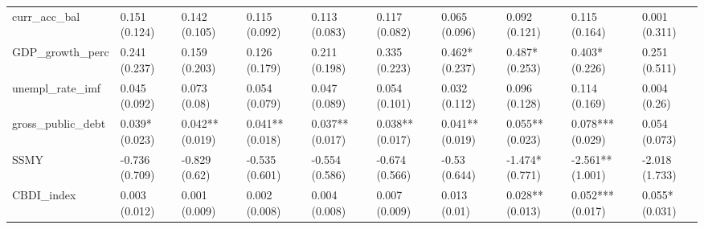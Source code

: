 \begin{table}[H]
\begin{subtable}[c]{\textwidth}
{\begin{tabular}{llllllllll}
  curr\_acc\_bal & 0.151 (0.124) & 0.142 (0.105) & 0.115 (0.092) & 0.113 (0.083) & 0.117 (0.082) & 0.065 (0.096) & 0.092 (0.121) & 0.115 (0.164) & 0.001 (0.311) \\ 
  GDP\_growth\_perc & 0.241 (0.237) & 0.159 (0.203) & 0.126 (0.179) & 0.211 (0.198) & 0.335 (0.223) & 0.462* (0.237) & 0.487* (0.253) & 0.403* (0.226) & 0.251 (0.511) \\ 
  unempl\_rate\_imf & 0.045 (0.092) & 0.073 (0.08) & 0.054 (0.079) & 0.047 (0.089) & 0.054 (0.101) & 0.032 (0.112) & 0.096 (0.128) & 0.114 (0.169) & 0.004 (0.26) \\ 
  gross\_public\_debt & 0.039* (0.023) & 0.042** (0.019) & 0.041** (0.018) & 0.037** (0.017) & 0.038** (0.017) & 0.041** (0.019) & 0.055** (0.023) & 0.078*** (0.029) & 0.054 (0.073) \\ 
  SSMY & -0.736 (0.709) & -0.829 (0.62) & -0.535 (0.601) & -0.554 (0.586) & -0.674 (0.566) & -0.53 (0.644) & -1.474* (0.771) & -2.561** (1.001) & -2.018 (1.733) \\ 
  CBDI\_index & 0.003 (0.012) & 0.001 (0.009) & 0.002 (0.008) & 0.004 (0.008) & 0.007 (0.009) & 0.013 (0.01) & 0.028** (0.013) & 0.052*** (0.017) & 0.055* (0.031) \\ 
   \bottomrule
\end{tabular}}



\end{subtable}
\end{table}
